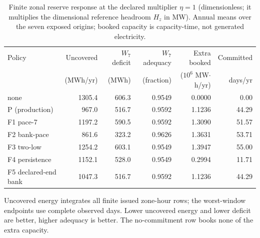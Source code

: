 \begin{table}[!tbp]
\centering
\caption{Finite zonal reserve response at the declared multiplier $\eta=1$ (dimensionless; it multiplies the dimensional reference headroom $H_z$ in MW). Annual means over the seven exposed origins; booked capacity is capacity-time, not generated electricity.}
\label{tab:r2-physical}
\scriptsize
\setlength{\tabcolsep}{3pt}
\begin{tabular}{@{}lrrrrr@{}}
\toprule
Policy & Uncovered & $W_7$ deficit & $W_7$ adequacy & Extra booked & Committed \\
& (MWh/yr) & (MWh) & (fraction) & ($10^6$ MW$\cdot$h/yr) & days/yr \\
\midrule
none & 1305.4 & 606.3 & 0.9549 & 0.0000 & 0.00 \\
P (production) & 967.0 & 516.7 & 0.9592 & 1.1236 & 44.29 \\
F1 pace-7 & 1197.2 & 590.5 & 0.9592 & 1.3090 & 51.57 \\
F2 bank-pace & 861.6 & 323.2 & 0.9626 & 1.3631 & 53.71 \\
F3 two-low & 1254.2 & 603.1 & 0.9549 & 1.3947 & 55.00 \\
F4 persistence & 1152.1 & 528.0 & 0.9549 & 0.2994 & 11.71 \\
F5 declared-end bank & 1047.3 & 516.7 & 0.9592 & 1.1236 & 44.29 \\
\bottomrule
\end{tabular}
\par\footnotesize Uncovered energy integrates all finite issued zone-hour rows; the worst-window endpoints use complete observed days. Lower uncovered energy and lower deficit are better, higher adequacy is better. The no-commitment row books none of the extra capacity.
\end{table}
